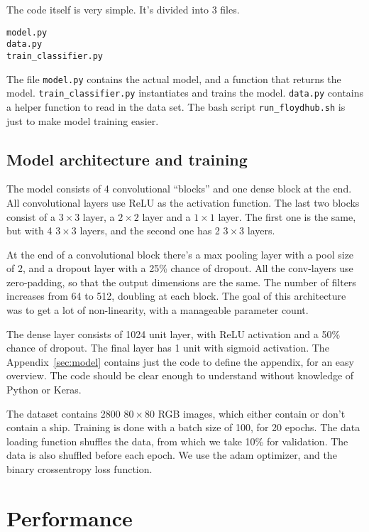The code itself is very simple. It's divided into 3 files.
\begin{verbatim}
model.py
data.py
train_classifier.py
\end{verbatim}
The file \verb|model.py| contains the actual model, and a function that returns
the model. \verb|train_classifier.py| instantiates and trains the model.
\verb|data.py| contains a helper function to read in the data set.  The bash
script \verb|run_floydhub.sh| is just to make model training easier.

\subsection{Model architecture and training}

The model consists of 4 convolutional ``blocks'' and one dense block at the
end. All convolutional layers use ReLU as the activation function.  The last
two blocks consist of a \(3\times3\) layer, a \(2\times2\) layer and a
\(1\times1\) layer. The first one is the same, but with 4 \(3\times3\) layers,
and the second one has 2 \(3\times3\) layers.

At the end of a convolutional block there's a max pooling layer with a pool
size of 2, and a dropout layer with a \num{25}\% chance of dropout. All the
conv-layers use zero-padding, so that the output dimensions are the same. The
number of filters increases from 64 to 512, doubling at each block. The goal of
this architecture was to get a lot of non-linearity, with a manageable
parameter count.

The dense layer consists of 1024 unit layer, with ReLU activation and a
\num{50}\% chance of dropout. The final layer has 1 unit with sigmoid
activation. The Appendix~\ref{sec:model} contains just the code to define the
appendix, for an easy overview. The code should be clear enough to understand
without knowledge of Python or Keras.

The dataset contains 2800 \(80\times80\) RGB images, which either contain or
don't contain a ship. Training is done with a batch size of 100, for 20 epochs.
The data loading function shuffles the data, from which we take 10\% for
validation. The data is also shuffled before each epoch. We use the adam
optimizer, and the binary crossentropy loss function.

\section{Performance}

